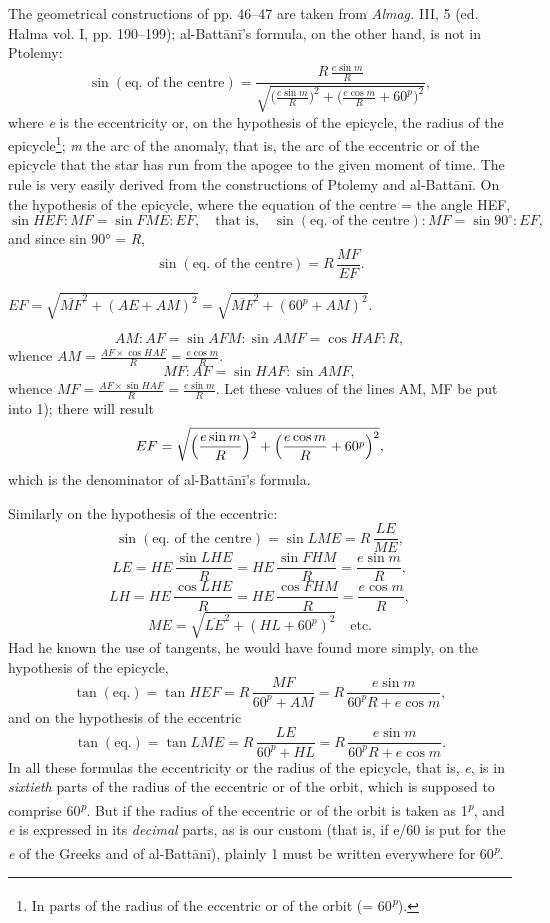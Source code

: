 \documentclass[11pt]{article}
\newcommand{\Pg}[1]{\marginpar{\footnotesize\color{gray}#1}}
\begin{document}
\par \Pg{I 220}The geometrical constructions of pp. 46–47 are taken from \emph{Almag.} III, 5 (ed. Halma vol. I, pp. 190–199); al-Battānī's formula, on the other hand, is not in Ptolemy: \[ \sin(\text{eq. of the centre}) = \frac{R\,\frac{e\sin m}{R}}{\sqrt{\bigl(\frac{e\sin m}{R}\bigr)^2 + \bigl(\frac{e\cos m}{R} + 60^{p}\bigr)^2}}, \] where \emph{e} is the eccentricity or, on the hypothesis of the epicycle, the radius of the epicycle\footnote{In parts of the radius of the eccentric or of the orbit (= 60\textsuperscript{\itshape p}).}; \emph{m} the arc of the anomaly, that is, the arc of the eccentric or of the epicycle that the star has run from the apogee to the given moment of time. The rule is very easily derived from the constructions of Ptolemy and al-Battānī. On the hypothesis of the epicycle, where the equation of the centre = the angle HEF, \[ \sin HEF : MF = \sin FME : EF, \quad\text{that is,}\quad \sin(\text{eq. of the centre}) : MF = \sin 90^\circ : EF, \] and since sin 90° = \emph{R}, \[ \sin(\text{eq. of the centre}) = R\,\frac{MF}{EF}. \] \par\noindent\hspace*{1.5em}$\displaystyle EF = \sqrt{\overline{MF}^2 + (AE + AM)^2} = \sqrt{\overline{MF}^2 + (60^{p} + AM)^2}.$\par \[ AM : AF = \sin AFM : \sin AMF = \cos HAF : R, \] whence $AM = \frac{AF \times \cos HAF}{R} = \frac{e\cos m}{R}$. \[ MF : AF = \sin HAF : \sin AMF, \] whence $MF = \frac{AF \times \sin HAF}{R} = \frac{e\sin m}{R}$. Let these values of the lines AM, MF be put into 1); there will result \[ EF = \sqrt{\Bigl(\frac{e\sin m}{R}\Bigr)^2 + \Bigl(\frac{e\cos m}{R} + 60^{p}\Bigr)^2}, \] which is the denominator of al-Battānī's formula.\par
\begin{center}\end{center}
\par Similarly on the hypothesis of the eccentric: \[ \sin(\text{eq. of the centre}) = \sin LME = R\,\frac{LE}{ME}, \] \[ LE = HE\,\frac{\sin LHE}{R} = HE\,\frac{\sin FHM}{R} = \frac{e\sin m}{R}, \] \[ LH = HE\,\frac{\cos LHE}{R} = HE\,\frac{\cos FHM}{R} = \frac{e\cos m}{R}, \] \[ ME = \sqrt{\overline{LE}^2 + (HL + 60^{p})^2} \quad\text{etc.} \] Had he known the use of tangents, he would have found more simply, on the hypothesis of the epicycle, \[ \tan(\text{eq.}) = \tan HEF = R\,\frac{MF}{60^{p} + AM} = R\,\frac{e\sin m}{60^{p}R + e\cos m}, \] and on the hypothesis of the eccentric \[ \tan(\text{eq.}) = \tan LME = R\,\frac{LE}{60^{p} + HL} = R\,\frac{e\sin m}{60^{p}R + e\cos m}. \] In all these formulas the eccentricity or the radius of the epicycle, that is, \emph{e}, is in \emph{sixtieth} parts of the radius of the eccentric or of the orbit, which is supposed to comprise 60\textsuperscript{\itshape p}. But if the radius of the eccentric or of the orbit is taken as 1\textsuperscript{\itshape p}, and \emph{e} is expressed in its \emph{decimal} parts, as is our custom (that is, if e/60 is put for the \emph{e} of the Greeks and of al-Battānī), plainly 1 must be written everywhere for 60\textsuperscript{\itshape p}.\par
\end{document}
